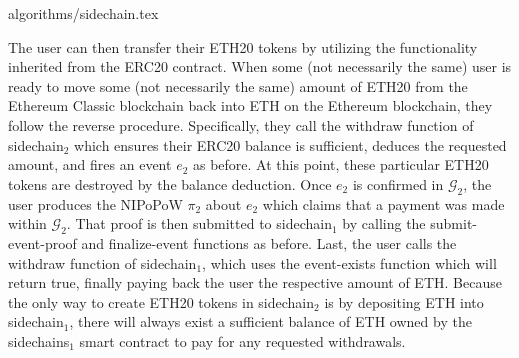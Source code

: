 {algorithms/sidechain.tex}

The user can then transfer their ETH20 tokens by utilizing the functionality
inherited from the \textsf{ERC20} contract.  When some (not necessarily the
same) user is ready to move some (not necessarily the same) amount of ETH20 from
the Ethereum Classic blockchain back into ETH on the Ethereum blockchain, they
follow the reverse procedure. Specifically, they call the \textsf{withdraw}
function of \textsf{sidechain}$_2$ which ensures their ERC20 balance is
sufficient, deduces the requested amount, and fires an event $e_2$ as before. At
this point, these particular ETH20 tokens are destroyed by the balance
deduction. Once $e_2$ is confirmed in $\mathcal{G}_2$, the user produces the
NIPoPoW $\pi_2$ about $e_2$ which claims that a payment was made within
$\mathcal{G}_2$. That proof is then submitted to \textsf{sidechain}$_1$ by
calling the \textsf{submit-event-proof} and \textsf{finalize-event} functions as
before. Last, the user calls the \textsf{withdraw} function of
\textsf{sidechain}$_1$, which uses the \textsf{event-exists} function which will
return \textsf{true}, finally paying back the user the respective amount of ETH.
Because the only way to create ETH20 tokens in \textsf{sidechain}$_2$ is by
depositing ETH into \textsf{sidechain}$_1$, there will always exist a sufficient
balance of ETH owned by the \textsf{sidechains}$_1$ smart contract to pay for
any requested withdrawals.
